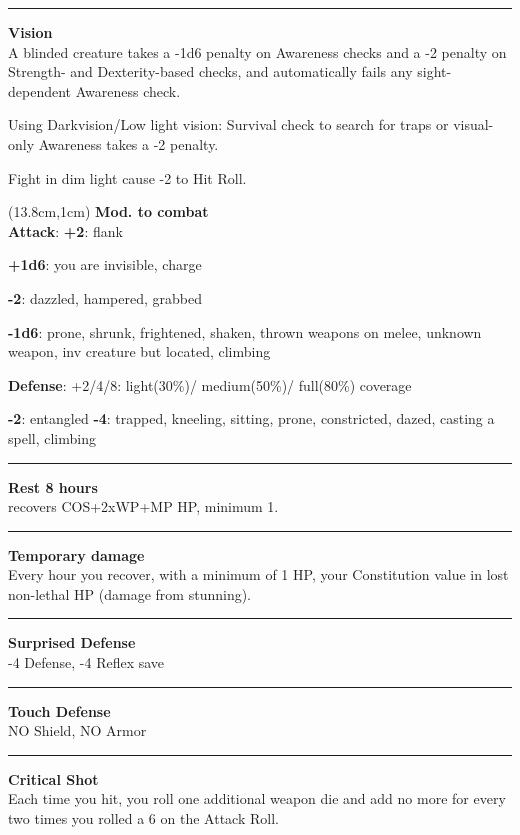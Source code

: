 \documentclass[a4paper,12 pt,openany]{book}
\newcommand{\linex}{\rule{\textwidth}{0.4pt}}
\begin{document}
\begin{textblock*}{8.3cm}
\linex

\textbf{Vision}\\

A blinded creature  takes a -1d6 penalty on Awareness checks and a -2 penalty on Strength- and Dexterity-based checks, and automatically fails any sight-dependent Awareness check.

Using Darkvision/Low light vision: Survival check to search for traps or visual-only Awareness takes a -2 penalty.

Fight in dim light cause -2 to Hit Roll.


\end{textblock*}

\begin{textblock*}{6.2cm}(13.8cm,1cm) %
\textbf{Mod. to combat}\\
\textbf{Attack}:
\textbf{+2}: flank

\textbf{+1d6}: you are invisible, charge

\textbf{-2}: dazzled, hampered, grabbed

\textbf{-1d6}: prone, shrunk, frightened, shaken, thrown weapons on melee, unknown weapon, inv creature but located, climbing

\textbf{Defense}: +2/4/8: light(30\%)/ medium(50\%)/ full(80\%) coverage

\textbf{-2}: entangled \textbf{-4}: trapped, kneeling, sitting, prone, constricted, dazed, casting a spell, climbing
\linex

\textbf{Rest 8 hours} \\recovers COS+2xWP+MP HP, minimum 1.

\linex

\textbf{Temporary damage}\\ Every hour you recover, with a minimum of 1 HP, your Constitution value in lost non-lethal HP (damage from stunning).

\linex

\textbf{Surprised Defense}\\ -4 Defense, -4 Reflex save

\linex

\textbf{Touch Defense}\\ NO Shield, NO Armor

\linex

\textbf{Critical Shot}\\
Each time you hit, you roll one additional weapon die and add no more for every two times you rolled a 6 on the Attack Roll.


\end{textblock*}
\end{document}
